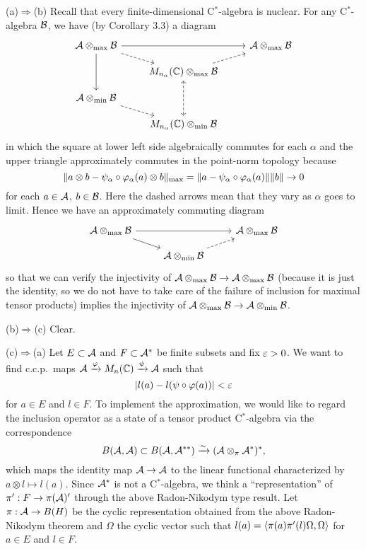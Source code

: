 \documentclass{../../small}
\begin{document}
\begin{pf}
(a)$\Rightarrow$(b)
Recall that every finite-dimensional C$^*$-algebra is nuclear.
For any C$^*$-algebra $\mathcal{B}$, we have (by Corollary 3.3) a diagram
\[\begin{tikzcd}[row sep=10pt]
\cA\otimes_{\max}\cB \ar{rr}\ar[dashed]{rd}\ar{dd} && \cA\otimes_{\max}\cB\\
&M_{n_\alpha}(\C)\otimes_{\max}\cB \ar[dashed]{ru}\ar[dashed,leftrightarrow]{dd}&\\
\cA\otimes_{\min}\cB \ar[dashed]{rd} &&\\
&M_{n_\alpha}(\C)\otimes_{\min}\cB&
\end{tikzcd}\]
in which the square at lower left side algebraically commutes for each $\alpha$ and the upper triangle approximately commutes in the point-norm topology because
\[\|a\otimes b-\psi_\alpha\circ\varphi_\alpha(a)\otimes b\|_{\max}=\|a-\psi_\alpha\circ\varphi_\alpha(a)\|\|b\|\to0\]
for each $a\in\mathcal{A}$, $b\in\mathcal{B}$.
Here the dashed arrows mean that they vary as $\alpha$ goes to limit.
Hence we have an approximately commuting diagram
\[\begin{tikzcd}[row sep=10pt]
\cA\otimes_{\max}\cB \ar{rr}\ar{rd} && \cA\otimes_{\max}\cB\\
&\cA\otimes_{\min}\cB \ar[dashed]{ur}&
\end{tikzcd}\]
so that we can verify the injectivity of $\mathcal{A}\otimes_{\max}\mathcal{B}\to\mathcal{A}\otimes_{\max}\mathcal{B}$ (because it is just the identity, so we do not have to take care of the failure of inclusion for maximal tensor products) implies the injectivity of $\mathcal{A}\otimes_{\max}\mathcal{B}\to\mathcal{A}\otimes_{\min}\mathcal{B}$.

(b)$\Rightarrow$(c)
Clear.

(c)$\Rightarrow$(a)
Let $E\subset\mathcal{A}$ and $F\subset\mathcal{A}^*$ be finite subsets and fix $\varepsilon>0$.
We want to find c.c.p.~maps $\mathcal{A}\xrightarrow{\varphi}M_n(\mathbb{C})\xrightarrow{\psi}\mathcal{A}$ such that
\[|l(a)-l(\psi\circ\varphi(a))|<\varepsilon\]
for $a\in E$ and $l\in F$.
To implement the approximation, we would like to regard the inclusion operator as a state of a tensor product C$^*$-algebra via the correspondence
\[B(\mathcal{A},\mathcal{A})\subset B(\mathcal{A},\mathcal{A}^{**})\xrightarrow{\sim}(\mathcal{A}\otimes_\pi\mathcal{A}^*)^*,\]
which maps the identity map $\mathcal{A}\to\mathcal{A}$ to the linear functional characterized by $a\otimes l\mapsto l(a)$.
Since $\mathcal{A}^*$ is not a C$^*$-algebra, we think a ``representation'' of $\pi':F\to\pi(\mathcal{A})'$ through the above Radon-Nikodym type result.
Let $\pi:\mathcal{A}\to B(H)$ be the cyclic representation obtained from the above Radon-Nikodym theorem and $\Omega$ the cyclic vector such that $l(a)=\langle\pi(a)\pi'(l)\Omega,\Omega\rangle$ for $a\in E$ and $l\in F$.


\end{pf}
\end{document}
